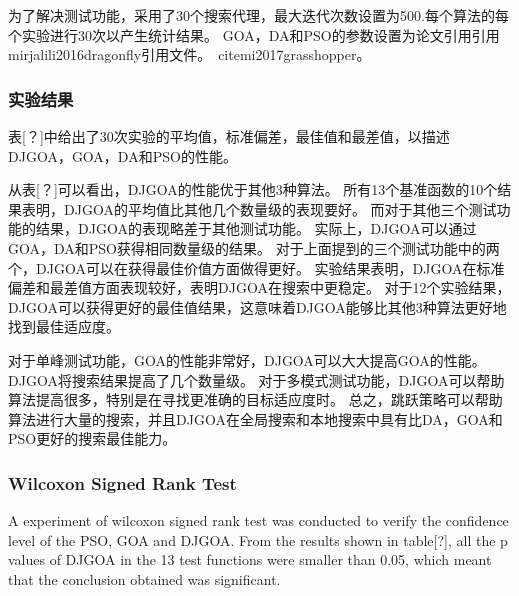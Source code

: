 为了解决测试功能，采用了30个搜索代理，最大迭代次数设置为500.每个算法的每个实验进行30次以产生统计结果。 GOA，DA和PSO的参数设置为论文引用{引用{mirjalili2016dragonfly}引用文件。\ citemi2017grasshopper}。


\subsubsection{实验结果}
表[？]中给出了30次实验的平均值，标准偏差，最佳值和最差值，以描述DJGOA，GOA，DA和PSO的性能。

从表[？]可以看出，DJGOA的性能优于其他3种算法。 所有13个基准函数的10个结果表明，DJGOA的平均值比其他几个数量级的表现要好。 而对于其他三个测试功能的结果，DJGOA的表现略差于其他测试功能。 实际上，DJGOA可以通过GOA，DA和PSO获得相同数量级的结果。 对于上面提到的三个测试功能中的两个，DJGOA可以在获得最佳价值方面做得更好。 实验结果表明，DJGOA在标准偏差和最差值方面表现较好，表明DJGOA在搜索中更稳定。 对于12个实验结果，DJGOA可以获得更好的最佳值结果，这意味着DJGOA能够比其他3种算法更好地找到最佳适应度。  

对于单峰测试功能，GOA的性能非常好，DJGOA可以大大提高GOA的性能。 DJGOA将搜索结果提高了几个数量级。 对于多模式测试功能，DJGOA可以帮助算法提高很多，特别是在寻找更准确的目标适应度时。 总之，跳跃策略可以帮助算法进行大量的搜索，并且DJGOA在全局搜索和本地搜索中具有比DA，GOA和PSO更好的搜索最佳能力。





\subsubsection{Wilcoxon Signed Rank Test}
A experiment of wilcoxon signed rank test was conducted to verify the confidence level of the PSO, GOA and DJGOA. From the  results shown in table[?], all the p values of DJGOA in the 13 test functions were smaller than 0.05, which meant that the conclusion obtained was significant.

